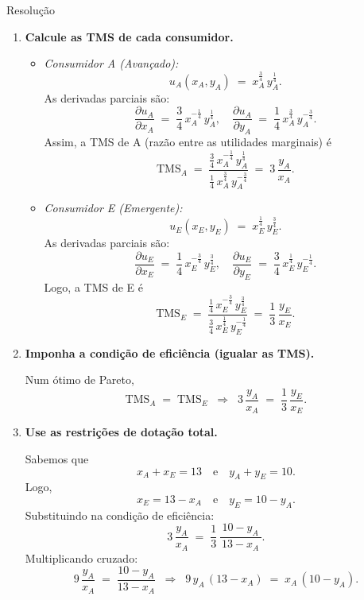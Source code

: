 \documentclass[a4paper,12pt]{article}[abntex2]
\begin{document}
Resolução\begin{enumerate}
    \item \textbf{Calcule as TMS de cada consumidor.}
    
    \begin{itemize}
        \item \emph{Consumidor A (Avançado):}  
        \[
            u_A(x_A, y_A) \;=\; x_A^{\frac{3}{4}}\,y_A^{\frac{1}{4}}.
        \]
        As derivadas parciais são:
        \[
            \frac{\partial u_A}{\partial x_A} 
            \;=\;\frac{3}{4}\,x_A^{-\frac{1}{4}}\,y_A^{\frac{1}{4}}, 
            \quad
            \frac{\partial u_A}{\partial y_A} 
            \;=\;\frac{1}{4}\,x_A^{\frac{3}{4}}\,y_A^{-\frac{3}{4}}.
        \]
        Assim, a TMS de A (razão entre as utilidades marginais) é
        \[
            \mathrm{TMS}_A 
            \;=\; 
            \frac{\frac{3}{4}\,x_A^{-\frac{1}{4}}\,y_A^{\frac{1}{4}}}
                 {\frac{1}{4}\,x_A^{\frac{3}{4}}\,y_A^{-\frac{3}{4}}}
            \;=\; 3\,\frac{y_A}{x_A}.
        \]

        \item \emph{Consumidor E (Emergente):}
        \[
            u_E(x_E, y_E) \;=\; x_E^{\frac{1}{4}}\,y_E^{\frac{3}{4}}.
        \]
        As derivadas parciais são:
        \[
            \frac{\partial u_E}{\partial x_E} 
            \;=\;\frac{1}{4}\,x_E^{-\frac{3}{4}}\,y_E^{\frac{3}{4}}, 
            \quad
            \frac{\partial u_E}{\partial y_E} 
            \;=\;\frac{3}{4}\,x_E^{\frac{1}{4}}\,y_E^{-\frac{1}{4}}.
        \]
        Logo, a TMS de E é
        \[
            \mathrm{TMS}_E 
            \;=\; 
            \frac{\frac{1}{4}\,x_E^{-\frac{3}{4}}\,y_E^{\frac{3}{4}}}
                 {\frac{3}{4}\,x_E^{\frac{1}{4}}\,y_E^{-\frac{1}{4}}}
            \;=\;\frac{1}{3}\,\frac{y_E}{x_E}.
        \]
    \end{itemize}
    
    \item \textbf{Imponha a condição de eficiência (igualar as TMS).}

    Num ótimo de Pareto,
    \[
        \mathrm{TMS}_A 
        \;=\; 
        \mathrm{TMS}_E 
        \;\;\Longrightarrow\;\;
        3\,\frac{y_A}{x_A} 
        \;=\; 
        \frac{1}{3}\,\frac{y_E}{x_E}.
    \]

    \item \textbf{Use as restrições de dotação total.}

    Sabemos que
    \[
        x_A + x_E = 13
        \quad\text{e}\quad
        y_A + y_E = 10.
    \]
    Logo,
    \[
        x_E = 13 - x_A
        \quad\text{e}\quad
        y_E = 10 - y_A.
    \]
    Substituindo na condição de eficiência:
    \[
        3\,\frac{y_A}{x_A}
        \;=\;
        \frac{1}{3}\,\frac{\,10 - y_A\,}{\,13 - x_A\,}.
    \]
    Multiplicando cruzado:
    \[
        9\,\frac{y_A}{x_A}
        \;=\;
        \frac{10 - y_A}{13 - x_A}
        \;\;\Longrightarrow\;\;
        9\,y_A\,(13 - x_A) \;=\; x_A\,(10 - y_A).
    \]


\end{enumerate}
\end{document}
